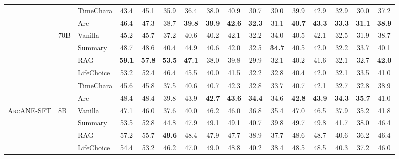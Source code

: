 \documentclass[11pt]{article}
\newcommand{\ours}{\textsc{ArcANE}}
\begin{document}
\begin{table}[!htbp]
\begin{tabular}{lllccccccccccccc}
 &  & TimeChara & 43.4 & 45.1 & 35.9 & 36.4 & 38.0 & 40.9 & 30.7 & 30.0 & 39.9 & 42.9 & 32.9 & 30.0 & 37.2 \\
 &  & \cellcolor{yellow!15} Arc & \cellcolor{yellow!15} 46.4 & \cellcolor{yellow!15} 47.3 & \cellcolor{yellow!15} 38.7 & \cellcolor{yellow!15} \textbf{39.8} & \cellcolor{yellow!15} \textbf{39.9} & \cellcolor{yellow!15} \textbf{42.6} & \cellcolor{yellow!15} \textbf{32.3} & \cellcolor{yellow!15} 31.1 & \cellcolor{yellow!15} \textbf{40.7} & \cellcolor{yellow!15} \textbf{43.3} & \cellcolor{yellow!15} \textbf{33.3} & \cellcolor{yellow!15} \textbf{31.1} & \cellcolor{yellow!15} \textbf{38.9} \\
\cmidrule(l){2-16}
 & \multirow[t]{6}{*}{70B} & Vanilla & 45.2 & 45.7 & 37.2 & 40.6 & 40.2 & 42.1 & 32.2 & 34.0 & 40.5 & 42.1 & 32.5 & 31.9 & 38.7 \\
 &  & Summary & 48.7 & 48.6 & 40.4 & 44.9 & 40.6 & 42.0 & 32.5 & \textbf{34.7} & 40.5 & 42.0 & 32.2 & 33.7 & 40.1 \\
 &  & RAG & \textbf{59.1} & \textbf{57.8} & \textbf{53.5} & \textbf{47.1} & 38.0 & 39.8 & 29.9 & 32.1 & 40.2 & 41.6 & 32.1 & 32.7 & \textbf{42.0} \\
 &  & LifeChoice & 53.2 & 52.4 & 46.4 & 45.5 & 40.0 & 41.5 & 32.2 & 32.8 & 40.4 & 42.0 & 32.1 & 33.5 & 41.0 \\
 &  & TimeChara & 45.6 & 45.8 & 37.5 & 40.6 & 40.7 & 42.3 & 32.8 & 33.7 & 40.7 & 42.1 & 32.7 & 32.8 & 38.9 \\
 &  & \cellcolor{yellow!15} Arc & \cellcolor{yellow!15} 48.4 & \cellcolor{yellow!15} 48.4 & \cellcolor{yellow!15} 39.8 & \cellcolor{yellow!15} 43.9 & \cellcolor{yellow!15} \textbf{42.7} & \cellcolor{yellow!15} \textbf{43.6} & \cellcolor{yellow!15} \textbf{34.4} & \cellcolor{yellow!15} 34.6 & \cellcolor{yellow!15} \textbf{42.8} & \cellcolor{yellow!15} \textbf{43.9} & \cellcolor{yellow!15} \textbf{34.3} & \cellcolor{yellow!15} \textbf{35.7} & \cellcolor{yellow!15} 41.0 \\
\midrule
\multirow[t]{12}{*}{\ours{}-SFT} & \multirow[t]{6}{*}{8B} & Vanilla & 47.1 & 46.0 & 37.6 & 40.0 & 46.2 & 46.0 & 36.8 & 35.4 & 47.0 & 46.5 & 37.9 & 35.2 & 41.8 \\
 &  & Summary & 53.5 & 52.8 & 44.8 & 47.9 & 49.1 & 49.1 & 40.7 & 39.8 & 49.7 & 49.8 & 41.7 & 38.0 & 46.4 \\
 &  & RAG & 57.2 & 55.7 & \textbf{49.6} & 48.4 & 47.9 & 47.7 & 38.9 & 37.7 & 48.6 & 48.7 & 40.6 & 36.2 & 46.4 \\
 &  & LifeChoice & 54.4 & 53.2 & 46.2 & 47.0 & 49.0 & 48.8 & 40.2 & 38.4 & 48.5 & 48.5 & 40.3 & 37.2 & 46.0 \\

\end{tabular}
\end{table}
\end{document}
